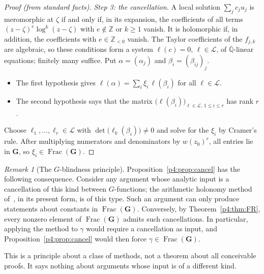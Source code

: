 \documentclass[11pt,a4paper]{article}
\theoremstyle{definition}
\theoremstyle{remark}
\newtheorem{remark}[theorem]{Remark}
\newcommand{\Z}{\mathbb Z}
\newcommand{\Qbar}{\overline{\mathbb Q}}
\newcommand{\bG}{\mathbf G}
\DeclareMathOperator{\Frac}{Frac}
\numberwithin{equation}{section}
\begin{document}
\begin{proof}[Proof (from standard facts)]
\emph{Step 3: the cancellation.} A local solution $\sum_jc_ju_j$ is meromorphic at $\zeta$ if and only if, in its expansion, the coefficients of all terms $(z-\zeta)^e\log^k(z-\zeta)$ with $e\notin\Z$ or $k\ge1$ vanish. It is holomorphic if, in addition, the coefficients with $e\in\Z_{<0}$ vanish. The Taylor coefficients of the $f_{j,k}$ are algebraic, so these conditions form a system $\ell(c)=0$, $\ell\in\mathcal L$, of $\Qbar$-linear equations; finitely many suffice. Put $\alpha=(\alpha_j)$ and $\beta_i=(\beta_{ij})_j$.
\begin{itemize}[leftmargin=1.5em]
\item The first hypothesis gives $\ell(\alpha)=\sum_i\xi_i\,\ell(\beta_i)$ for all $\ell\in\mathcal L$.
\item The second hypothesis says that the matrix $\bigl(\ell(\beta_i)\bigr)_{\ell\in\mathcal L,\,1\le i\le r}$ has rank $r$.
\end{itemize}
Choose $\ell_1,\dots,\ell_r\in\mathcal L$ with $\det\bigl(\ell_k(\beta_i)\bigr)\ne0$ and solve for the $\xi_i$ by Cramer's rule. After multiplying numerators and denominators by $w(z_0)^r$, all entries lie in $\bG$, so $\xi_i\in\Frac(\bG)$.
\end{proof}

\begin{remark}[The $G$-blindness principle]\label{p4:rem:blind}
Proposition~\ref{p4:prop:cancel} has the following consequence. Consider any argument whose analytic input is a cancellation of this kind between $G$-functions; the arithmetic holonomy method of~\cite{p4:CDT}, in its present form, is of this type. Such an argument can only produce statements about constants in $\Frac(\bG)$. Conversely, by Theorem~\ref{p4:thm:FR}, every nonzero element of $\Frac(\bG)$ admits such cancellations. In particular, applying the method to $\gamma$ would require a cancellation as input, and Proposition~\ref{p4:prop:cancel} would then force $\gamma\in\Frac(\bG)$.

This is a principle about a class of methods, not a theorem about all conceivable proofs. It says nothing about arguments whose input is of a different kind.
\end{remark}
\end{document}
